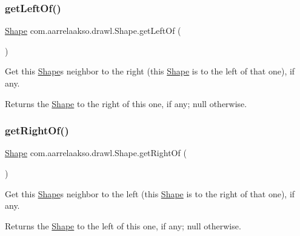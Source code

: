 \subsubsection{\texorpdfstring{get\+Left\+Of()}{getLeftOf()}}
{\footnotesize\ttfamily \hyperlink{classcom_1_1aarrelaakso_1_1drawl_1_1_shape}{Shape} com.\+aarrelaakso.\+drawl.\+Shape.\+get\+Left\+Of (\begin{DoxyParamCaption}{ }\end{DoxyParamCaption})\hspace{0.3cm}{\ttfamily [inherited]}}



Get this \hyperlink{classcom_1_1aarrelaakso_1_1drawl_1_1_shape}{Shape}\textquotesingle{}s neighbor to the right (this \hyperlink{classcom_1_1aarrelaakso_1_1drawl_1_1_shape}{Shape} is to the left of that one), if any. 

\begin{DoxyReturn}{Returns}
the \hyperlink{classcom_1_1aarrelaakso_1_1drawl_1_1_shape}{Shape} to the right of this one, if any; {\ttfamily null} otherwise. 
\end{DoxyReturn}
\mbox{\label{classcom_1_1aarrelaakso_1_1drawl_1_1_shape_a1ad573b06f341aa79f6a255a476ae6e4}} 
\subsubsection{\texorpdfstring{get\+Right\+Of()}{getRightOf()}}
{\footnotesize\ttfamily \hyperlink{classcom_1_1aarrelaakso_1_1drawl_1_1_shape}{Shape} com.\+aarrelaakso.\+drawl.\+Shape.\+get\+Right\+Of (\begin{DoxyParamCaption}{ }\end{DoxyParamCaption})\hspace{0.3cm}{\ttfamily [inherited]}}



Get this \hyperlink{classcom_1_1aarrelaakso_1_1drawl_1_1_shape}{Shape}\textquotesingle{}s neighbor to the left (this \hyperlink{classcom_1_1aarrelaakso_1_1drawl_1_1_shape}{Shape} is to the right of that one), if any. 

\begin{DoxyReturn}{Returns}
the \hyperlink{classcom_1_1aarrelaakso_1_1drawl_1_1_shape}{Shape} to the left of this one, if any; {\ttfamily null} otherwise. 
\end{DoxyReturn}
\mbox{\label{classcom_1_1aarrelaakso_1_1drawl_1_1_shape_a4e1d54c7e161e3af5053939ddefdf9e6}} 
